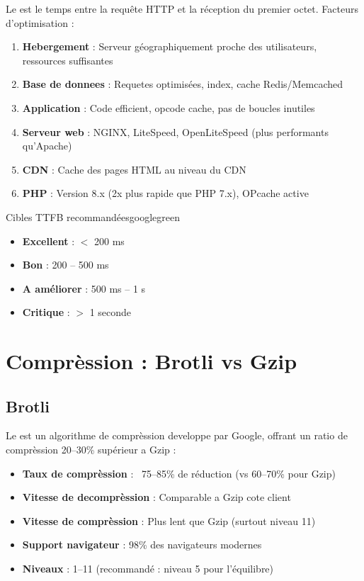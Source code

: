 Le  est le temps entre la requête HTTP et la réception du premier octet. Facteurs d'optimisation :

\begin{enumerate}
    \item \textbf{Hebergement} : Serveur géographiquement proche des utilisateurs, ressources suffisantes
    \item \textbf{Base de donnees} : Requetes optimisées, index, cache Redis/Memcached
    \item \textbf{Application} : Code efficient, opcode cache, pas de boucles inutiles
    \item \textbf{Serveur web} : NGINX, LiteSpeed, OpenLiteSpeed (plus performants qu'Apache)
    \item \textbf{CDN} : Cache des pages HTML au niveau du CDN
    \item \textbf{PHP} : Version 8.x (2x plus rapide que PHP 7.x), OPcache active
\end{enumerate}

\begin{mybox}{Cibles TTFB recommandées}{googlegreen}
\begin{itemize}
    \item \textbf{Excellent} : $<$ 200 ms
    \item \textbf{Bon} : 200 -- 500 ms
    \item \textbf{A améliorer} : 500 ms -- 1 s
    \item \textbf{Critique} : $>$ 1 seconde
\end{itemize}
\end{mybox}

\section{Comprèssion : Brotli vs Gzip}

\subsection{Brotli}

Le  est un algorithme de comprèssion developpe par Google, offrant un ratio de comprèssion 20--30\% supérieur a Gzip :

\begin{itemize}
    \item \textbf{Taux de comprèssion} : ~75--85\% de réduction (vs 60--70\% pour Gzip)
    \item \textbf{Vitesse de decomprèssion} : Comparable a Gzip cote client
    \item \textbf{Vitesse de comprèssion} : Plus lent que Gzip (surtout niveau 11)
    \item \textbf{Support navigateur} : 98\% des navigateurs modernes
    \item \textbf{Niveaux} : 1--11 (recommandé : niveau 5 pour l'équilibre)
\end{itemize}

